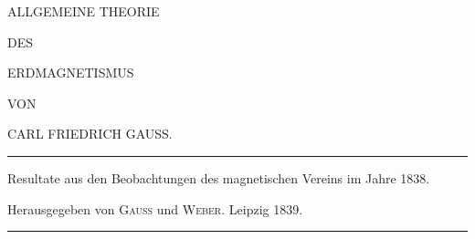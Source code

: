 \clearpage
\thispagestyle{empty}
\begin{center}
\vspace*{1in}
{\Large ALLGEMEINE THEORIE\par}
\bigskip
DES\par
\bigskip
{\Large ERDMAGNETISMUS\par}
\vspace{.5in}
{\small VON\par}
\bigskip
CARL FRIEDRICH GAUSS.\par
\vfill
\rule{.8\textwidth}{.3pt}\par
\medskip
{\small Resultate aus den Beobachtungen des magnetischen Vereins im Jahre 1838.\par
Herausgegeben von \textsc{Gauss} und \textsc{Weber}. Leipzig 1839.\par}
\medskip
\rule{.8\textwidth}{.3pt}\par
\end{center}
\clearpage
